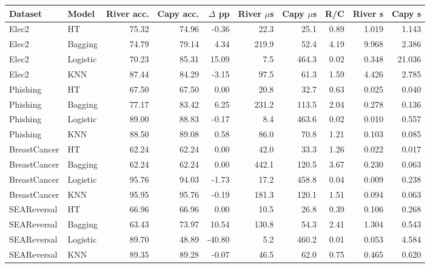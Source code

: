 \begin{tabular}{llrrrrrrrr}
\toprule
Dataset & Model & River acc. & Capy acc. & $\Delta$ pp & River $\mu$s & Capy $\mu$s & R/C & River s & Capy s \\
\midrule
Elec2 & HT & 75.32 & 74.96 & -0.36 & 22.3 & 25.1 & 0.89 & 1.019 & 1.143 \\
Elec2 & Bagging & 74.79 & 79.14 & 4.34 & 219.9 & 52.4 & 4.19 & 9.968 & 2.386 \\
Elec2 & Logistic & 70.23 & 85.31 & 15.09 & 7.5 & 464.3 & 0.02 & 0.348 & 21.036 \\
Elec2 & KNN & 87.44 & 84.29 & -3.15 & 97.5 & 61.3 & 1.59 & 4.426 & 2.785 \\
Phishing & HT & 67.50 & 67.50 & 0.00 & 20.8 & 32.7 & 0.63 & 0.025 & 0.040 \\
Phishing & Bagging & 77.17 & 83.42 & 6.25 & 231.2 & 113.5 & 2.04 & 0.278 & 0.136 \\
Phishing & Logistic & 89.00 & 88.83 & -0.17 & 8.4 & 463.6 & 0.02 & 0.010 & 0.557 \\
Phishing & KNN & 88.50 & 89.08 & 0.58 & 86.0 & 70.8 & 1.21 & 0.103 & 0.085 \\
BreastCancer & HT & 62.24 & 62.24 & 0.00 & 42.0 & 33.3 & 1.26 & 0.022 & 0.017 \\
BreastCancer & Bagging & 62.24 & 62.24 & 0.00 & 442.1 & 120.5 & 3.67 & 0.230 & 0.063 \\
BreastCancer & Logistic & 95.76 & 94.03 & -1.73 & 17.2 & 458.8 & 0.04 & 0.009 & 0.238 \\
BreastCancer & KNN & 95.95 & 95.76 & -0.19 & 181.3 & 120.1 & 1.51 & 0.094 & 0.063 \\
SEAReversal & HT & 66.96 & 66.96 & 0.00 & 10.5 & 26.8 & 0.39 & 0.106 & 0.268 \\
SEAReversal & Bagging & 63.43 & 73.97 & 10.54 & 130.8 & 54.3 & 2.41 & 1.304 & 0.543 \\
SEAReversal & Logistic & 89.70 & 48.89 & -40.80 & 5.2 & 460.2 & 0.01 & 0.053 & 4.584 \\
SEAReversal & KNN & 89.35 & 89.28 & -0.07 & 46.5 & 62.0 & 0.75 & 0.465 & 0.620 \\
\bottomrule
\end{tabular}
